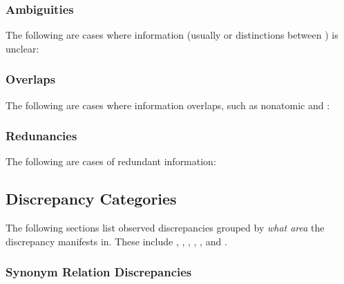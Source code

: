 

\subsubsection{Ambiguities}
\label{ambi}
The following are cases where information (usually  or distinctions
between \terms{}) is unclear:



\subsubsection{Overlaps}
\label{over}
The following are cases where information overlaps, such as nonatomic 
and \terms{}:



\ifnotpaper
    \subsubsection{Redunancies}
    \label{redun}
    The following are cases of redundant information:

    
\fi

\subsection{Discrepancy Categories}
\label{discrepCategories}

The following sections list observed discrepancies grouped by \emph{what area}
the discrepancy manifests in. These include , ,
, , , and .

\subsubsection{Synonym Relation Discrepancies}
\label{syns}


